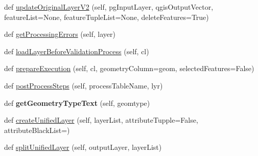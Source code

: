 \begin{DoxyCompactItemize}
\item 
def \mbox{\hyperlink{class_dsg_tools_1_1_validation_tools_1_1_validation_processes_1_1validation_process_1_1_validation_process_a7b4cd068aedb219df5f71ab7ed6cb3b5}{update\+Original\+Layer\+V2}} (self, pg\+Input\+Layer, qgis\+Output\+Vector, feature\+List=None, feature\+Tuple\+List=None, delete\+Features=True)
\item 
def \mbox{\hyperlink{class_dsg_tools_1_1_validation_tools_1_1_validation_processes_1_1validation_process_1_1_validation_process_a215af66bf2356fc61fcb06f7fd197da5}{get\+Processing\+Errors}} (self, layer)
\item 
def \mbox{\hyperlink{class_dsg_tools_1_1_validation_tools_1_1_validation_processes_1_1validation_process_1_1_validation_process_ae9f4d12aec5112802ab2bb77cceda153}{load\+Layer\+Before\+Validation\+Process}} (self, cl)
\item 
def \mbox{\hyperlink{class_dsg_tools_1_1_validation_tools_1_1_validation_processes_1_1validation_process_1_1_validation_process_a96fcc66b1ea9c259a30779fa832202c2}{prepare\+Execution}} (self, cl, geometry\+Column=\textquotesingle{}geom\textquotesingle{}, selected\+Features=False)
\item 
def \mbox{\hyperlink{class_dsg_tools_1_1_validation_tools_1_1_validation_processes_1_1validation_process_1_1_validation_process_ad6b6386ccfcef5397314e14c0341d896}{post\+Process\+Steps}} (self, process\+Table\+Name, lyr)
\item 
\mbox{\label{class_dsg_tools_1_1_validation_tools_1_1_validation_processes_1_1validation_process_1_1_validation_process_a973543e3972a8efe39c2b0239864b157}} 
def {\bfseries get\+Geometry\+Type\+Text} (self, geomtype)
\item 
def \mbox{\hyperlink{class_dsg_tools_1_1_validation_tools_1_1_validation_processes_1_1validation_process_1_1_validation_process_a2b31d0206a0f7090a2a381811f202120}{create\+Unified\+Layer}} (self, layer\+List, attribute\+Tupple=False, attribute\+Black\+List=\textquotesingle{}\textquotesingle{})
\item 
def \mbox{\hyperlink{class_dsg_tools_1_1_validation_tools_1_1_validation_processes_1_1validation_process_1_1_validation_process_aaf8851c2d2aac583b16393cff399ea27}{split\+Unified\+Layer}} (self, output\+Layer, layer\+List)
\item 
\mbox{\label{class_dsg_tools_1_1_validation_tools_1_1_validation_processes_1_1validation_process_1_1_validation_process_a0f8517872291b7efb41dc3e3deb13cca}} 

\end{DoxyCompactItemize}
